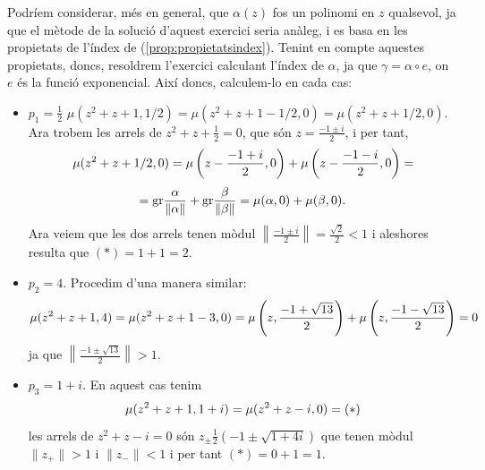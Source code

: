 \documentclass[../main.tex]{subfiles}
\begin{document}
\begin{sol}
Podríem considerar, més en general, que $\alpha(z)$ fos un polinomi en $z$ qualsevol, ja que el mètode de la solució d'aquest exercici seria anàleg, i es basa en les propietats de l'índex de (\ref{prop:propietatsindex}). Tenint en compte aquestes propietats, doncs, resoldrem l'exercici calculant l'índex de $\alpha$, ja que $\gamma = \alpha\circ e$, on $e$ és la funció exponencial. Així doncs, calculem-lo en cada cas:
\begin{itemize}
    \item \underline{$p_1 = \frac{1}{2}$} $\mu(z^2+z+1,1/2) = \mu(z^2+z+1-1/2,0) = \mu(z^2+z+1/2,0)$. Ara trobem les arrels de $z^2+z+\frac{1}{2} = 0$, que són $z = \frac{-1\pm i}{2}$, i per tant,
    \begin{equation}
        \notag
        \mu(z^2+z+1/2,0) = \mu\left(z-\frac{-1+i}{2},0\right)+\mu\left(z-\frac{-1-i}{2},0\right) = 
    \end{equation}
    \begin{equation}
        \notag
        =\mathrm{gr}\frac{\alpha}{\|\alpha\|}+\mathrm{gr}\frac{\beta}{\|\beta\|}=\mu(\alpha,0)+\mu(\beta,0).
    \end{equation}
    Ara veiem que les dos arrels tenen mòdul $\left\|\frac{-1\pm i}{2}\right\|=\frac{\sqrt{2}}{2}<1$ i aleshores resulta que $(*)=1+1=2$.
    \item \underline{$p_2 = 4$}. Procedim d'una manera similar:
    \begin{equation}
        \notag
        \mu(z^2+z+1,4)=\mu(z^2+z+1-3,0) = \mu\left(z,\frac{-1+\sqrt{13}}{2}\right)+\mu\left(z,\frac{-1-\sqrt{13}}{2}\right) = 0
    \end{equation}
    ja que $\left\|\frac{-1\pm\sqrt{13}}{2}\right\|>1$.
    \item \underline{$p_3 = 1+i$}. En aquest cas tenim
    \begin{equation}
        \notag
        \mu(z^2+z+1,1+i) = \mu(z^2+z-i,0) = (*)
    \end{equation}
    les arrels de $z^2+z-i=0$ són $z_{\pm}\frac{1}{2}(-1\pm\sqrt{1+4i})$ que tenen mòdul $\|z_+\|>1$ i $\|z_-\|<1$ i per tant $(*) = 0+1=1$.
\end{itemize}
\end{sol}
\end{document}
